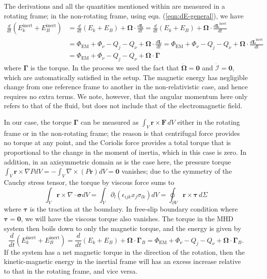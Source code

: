 The derivations and all the quantities mentioned within are measured in a rotating frame; in the non-rotating frame, using eqn. (\ref{eqn:dE-general}), we have 
%
\begin{equation}
\begin{aligned}
    \frac{d}{dt} (E_k^\mathrm{inert} + E_B^\mathrm{inert}) &= \frac{d}{dt}(E_k + E_B) + \boldsymbol{\Omega}\cdot \frac{d \mathbf{L}}{dt} = \frac{d}{dt}(E_k + E_B) + \boldsymbol{\Omega}\cdot \frac{d \mathbf{L}^\mathrm{inert}}{dt} \\ 
    &= \Phi_\mathrm{EM} + \Phi_\nu - Q_j - Q_\nu + \boldsymbol{\Omega}\cdot \frac{d \mathbf{L}}{dt} = \Phi_\mathrm{EM} + \Phi_\nu - Q_j - Q_\nu  + \boldsymbol{\Omega}\cdot \frac{d \mathbf{L}^\mathrm{inert}}{dt} \\ 
    &= \Phi_\mathrm{EM} + \Phi_\nu - Q_j - Q_\nu + \boldsymbol{\Omega}\cdot \boldsymbol{\Gamma}
\end{aligned}
\end{equation}
%
where $\boldsymbol{\Gamma}$ is the torque. In the process we used the fact that $\dot{\boldsymbol{\Omega}} = \mathbf{0}$ and $\dot{\mathcal{I}} = \mathbf{0}$, which are automatically satisfied in the setup. The magnetic energy has negligible change from one reference frame to another in the non-relativistic case, and hence requires no extra terms. We note, however, that the angular momentum here only refers to that of the fluid, but does not include that of the electromagnetic field. 

In our case, the torque $\boldsymbol{\Gamma}$ can be measured as $\int_V \mathbf{r}\times \mathbf{F} \, dV$ either in the rotating frame or in the non-rotating frame; the reason is that centrifugal force provides no torque at any point, and the Coriolis force provides a total torque that is proportional to the change in the moment of inertia, which in this case is zero. In addition, in an axisymmetric domain as is the case here, the pressure torque $\int_V \mathbf{r}\times \nabla P dV = - \int_V \nabla\times (P \mathbf{r}) dV = \mathbf{0}$ vanishes; due to the symmetry of the Cauchy stress tensor, the torque by viscous force sums to
%
\[
    \int_V \mathbf{r}\times \nabla\cdot \boldsymbol{\sigma} dV = \int_V \partial_l (\epsilon_{ijk} x_j \sigma_{lk}) dV = \oint_{\partial V} \mathbf{r} \times \boldsymbol{\tau} \, d\Sigma
\]
%
where $\boldsymbol{\tau}$ is the traction at the boundary. In free-slip boundary condition where $\boldsymbol{\tau} = \mathbf{0}$, we will have the viscous torque also vanishes.
The torque in the MHD system then boils down to only the magnetic torque, and the energy is given by
%
\begin{equation}
    \frac{d}{dt} (E_k^\mathrm{inert} + E_B^\mathrm{inert}) = \frac{d}{dt}(E_k + E_B) + \boldsymbol{\Omega}\cdot \boldsymbol{\Gamma}_B = \Phi_\mathrm{EM} + \Phi_\nu - Q_j - Q_\nu + \boldsymbol{\Omega}\cdot \boldsymbol{\Gamma}_B.
\end{equation}
%
If the system has a net magnetic torque in the direction of the rotation, then the kinetic-magnetic energy in the inertial frame will has an excess increase relative to that in the rotating frame, and vice versa.


